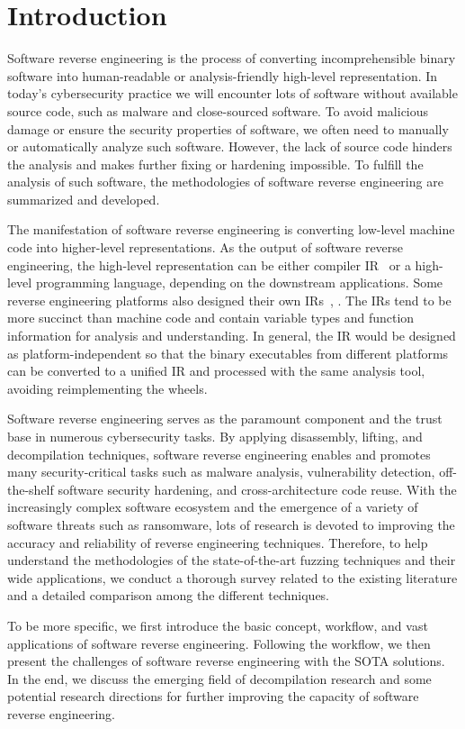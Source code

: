 \chapter{Introduction}\label{sec-introduction}


Software reverse engineering is the process of converting incomprehensible binary software into human-readable or analysis-friendly high-level representation. In today's cybersecurity practice we will encounter lots of software without available source code, such as malware and close-sourced software. To avoid malicious damage or ensure the security properties of software, we often need to manually or automatically analyze such software. However, the lack of source code hinders the analysis and makes further fixing or hardening impossible.
To fulfill the analysis of such software, the methodologies of software reverse engineering are summarized and developed.


The manifestation of software reverse engineering is converting low-level machine code into higher-level representations. As the output of software reverse engineering, the high-level representation can be either compiler IR~\cite{llvm-ir} or a high-level programming language, depending on the downstream applications. Some reverse engineering platforms also designed their own IRs~\cite{vex-ir}, \cite{bap-ir}. The IRs tend to be more succinct than machine code and contain variable types and function information for analysis and understanding. In general, the IR would be designed as platform-independent so that the binary executables from different platforms can be converted to a unified IR and processed with the same analysis tool, avoiding reimplementing the wheels.


Software reverse engineering serves as the paramount component and the trust base in numerous cybersecurity tasks. By applying disassembly, lifting, and decompilation techniques, software reverse engineering enables and promotes many security-critical tasks such as malware analysis, vulnerability detection, off-the-shelf software security hardening, and cross-architecture code reuse. With the increasingly complex software ecosystem and the emergence of a variety of software threats such as ransomware, lots of research is devoted to improving the accuracy and reliability of reverse engineering techniques. Therefore, to help understand the methodologies of the state-of-the-art fuzzing techniques and their wide applications, we conduct a thorough survey related to the existing literature and a detailed comparison among the different techniques.


To be more specific, we first introduce the basic concept, workflow, and vast applications of software reverse engineering. Following the workflow, we then present the challenges of software reverse engineering with the SOTA solutions. In the end, we discuss the emerging field of decompilation research and some potential research directions for further improving the capacity of software reverse engineering.


\newpage

